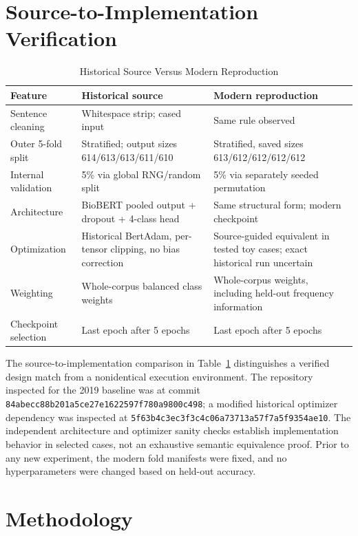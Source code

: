 \documentclass[conference]{IEEEtran}
\begin{document}
\section{Source-to-Implementation Verification}\label{sec:trace}
\begin{table}[t]
\centering
\caption{Historical Source Versus Modern Reproduction}\label{tab:trace}
\begin{tabular}{@{}p{}p{}p{}@{}}
\toprule
Feature & Historical source & Modern reproduction\\
\midrule
Sentence cleaning & Whitespace strip; cased input & Same rule observed\\
Outer 5-fold split & Stratified; output sizes 614/613/613/611/610 & Stratified, saved sizes 613/612/612/612/612\\
Internal validation & 5\% via global RNG/random split & 5\% via separately seeded permutation\\
Architecture & BioBERT pooled output + dropout + 4-class head & Same structural form; modern checkpoint\\
Optimization & Historical BertAdam, per-tensor clipping, no bias correction & Source-guided equivalent in tested toy cases; exact historical run uncertain\\
Weighting & Whole-corpus balanced class weights & Whole-corpus weights, including held-out frequency information\\
Checkpoint selection & Last epoch after 5 epochs & Last epoch after 5 epochs\\
\bottomrule
\end{tabular}
\end{table}

The source-to-implementation comparison in Table~\ref{tab:trace} distinguishes a verified design match from a nonidentical execution environment. The repository inspected for the 2019 baseline was at commit \texttt{84abecc88b201a5ce27e1622597f780a9800c498}; a modified historical optimizer dependency was inspected at \texttt{5f63b4c3ec3f3c4c06a73713a57f7a5f9354ae10}. The independent architecture and optimizer sanity checks establish implementation behavior in selected cases, not an exhaustive semantic equivalence proof. Prior to any new experiment, the modern fold manifests were fixed, and no hyperparameters were changed based on held-out accuracy.

\section{Methodology}\label{sec:method}
\end{document}
